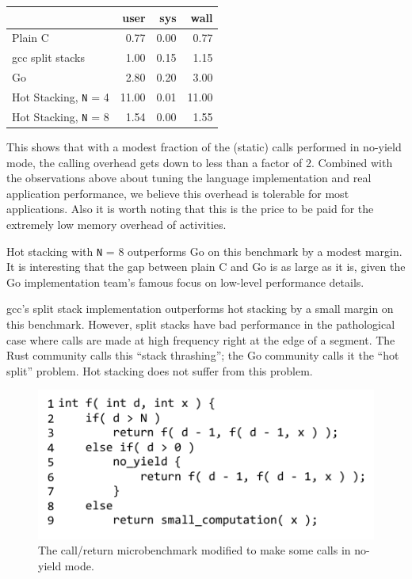 \documentclass[9pt,preprint]{sigplanconf-2}
\begin{document}
\vspace{1em}
\begin{tabular}{|l|r|r|r|}
  \hline
   & user & sys & wall \\
  \hline
  \hline
  Plain C & 0.77 & 0.00 & 0.77 \\
  \hline
  gcc split stacks\footnotemark{} & 1.00 & 0.15 & 1.15 \\
  \hline
  Go & 2.80 & 0.20 & 3.00 \\
  \hline
  Hot Stacking, \texttt{N} = 4 & 11.00 & 0.01 & 11.00 \\
  \hline
  Hot Stacking, \texttt{N} = 8 & 1.54 & 0.00 & 1.55 \\
  \hline
\end{tabular}
\vspace{1em}


This shows that with a modest fraction of the (static) calls performed in no-yield mode, the calling overhead gets down to less than a factor of 2.
Combined with the observations above about tuning the language implementation and real application performance, we believe this overhead is tolerable for most applications.
Also it is worth noting that this is the price to be paid for the extremely low memory overhead of activities.

Hot stacking with \texttt{N} = 8 outperforms Go on this benchmark by a modest margin.
It is interesting that the gap between plain C and Go is as large as it is, given the Go implementation team's famous focus on low-level performance details.

gcc's split stack implementation outperforms hot stacking by a small margin on this benchmark.
However, split stacks have bad performance in the pathological case where calls are made at high frequency right at the edge of a segment.
The Rust community calls this ``stack thrashing''; the Go community calls it the ``hot split'' problem.
Hot stacking does not suffer from this problem.

\begin{figure}
\includegraphics{just_calling_n_benchmark}
\caption{The call/return microbenchmark modified to make some calls in no-yield mode.}
\label{fig:micro_calling_n}
\end{figure}
\end{document}
